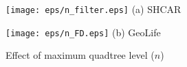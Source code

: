 \documentclass[10pt,conference,letterpaper]{IEEEtran}
\begin{document}

\begin{figure}[!t]\centering
	\scriptsize{
		\begin{minipage}{0.48\linewidth}
			\centering
			\texttt{[image: eps/n\_filter.eps]}
			(a) SHCAR
		\end{minipage}
		\hfill
		\begin{minipage}{0.48\linewidth}
			\centering
			\texttt{[image: eps/n\_FD.eps]}
			(b) GeoLife
		\end{minipage}
	}
	\caption{Effect of maximum quadtree level ($n$) \label{fig:LCELL}}
	\vspace{-.1in}
\end{figure}
\end{document}
